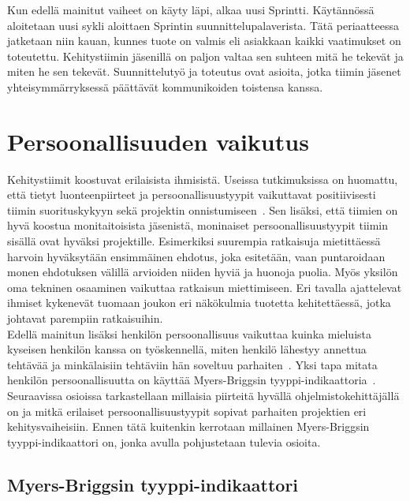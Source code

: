 \documentclass[finnish]{../tktltiki2}
\theoremstyle{definition}
\theoremstyle{remark}
\begin{document}
Kun edellä mainitut vaiheet on käyty läpi, alkaa uusi
Sprintti. Käytännössä aloitetaan uusi sykli aloittaen
Sprintin suunnittelupalaverista. Tätä periaatteessa jatketaan
niin kauan, kunnes tuote on valmis eli asiakkaan kaikki vaatimukset
on toteutettu. Kehitystiimin jäsenillä on paljon valtaa sen suhteen mitä he tekevät ja miten he
sen tekevät. Suunnittelutyö ja toteutus ovat asioita, jotka tiimin
jäsenet yhteisymmärryksessä päättävät kommunikoiden toistensa kanssa.

\section{Persoonallisuuden vaikutus}

Kehitystiimit koostuvat erilaisista ihmisistä. Useissa tutkimuksissa on huomattu, että tietyt
luonteenpiirteet ja persoonallisuustyypit vaikuttavat positiivisesti tiimin suorituskykyyn sekä
projektin onnistumiseen~\cite{Acuna:2008:ESP:1414004.1414056,Capretz:2003:PTS:766407.766410,Capretz:2010:MSS:1726559.1726574,Gorla:2004:WWB:990680.990684}. Sen lisäksi, että tiimien on hyvä koostua monitaitoisista
jäsenistä, moninaiset persoonallisuustyypit tiimin sisällä ovat hyväksi
projektille. Esimerkiksi suurempia ratkaisuja mietittäessä harvoin hyväksytään
ensimmäinen ehdotus, joka esitetään, vaan puntaroidaan monen ehdotuksen
välillä arvioiden niiden hyviä ja huonoja puolia. Myös yksilön oma
tekninen osaaminen vaikuttaa ratkaisun miettimiseen. Eri tavalla ajattelevat ihmiset kykenevät tuomaan joukon
eri näkökulmia tuotetta kehitettäessä, jotka johtavat parempiin ratkaisuihin.\\

Edellä mainitun lisäksi henkilön persoonallisuus vaikuttaa
kuinka mieluista kyseisen henkilön kanssa on työskennellä,
miten henkilö lähestyy annettua tehtävää ja minkälaisiin tehtäviin
hän soveltuu parhaiten~\cite{Begel:2008:PPW:1414004.1414026,Capretz:2010:MSS:1726559.1726574}. Yksi tapa mitata henkilön persoonallisuutta on käyttää Myers-Briggsin tyyppi-indikaattoria~\cite{Capretz:2003:PTS:766407.766410,Capretz:2010:MSS:1726559.1726574,DaCunha:2007:PMA:1230819.1241672}.
Seuraavissa osioissa tarkastellaan millaisia piirteitä hyvällä
ohjelmistokehittäjällä on ja mitkä erilaiset persoonallisuustyypit
sopivat parhaiten projektien eri kehitysvaiheisiin. Ennen tätä kuitenkin kerrotaan millainen Myers-Briggsin tyyppi-indikaattori on, jonka avulla pohjustetaan tulevia osioita.

\subsection{Myers-Briggsin tyyppi-indikaattori}
\end{document}
